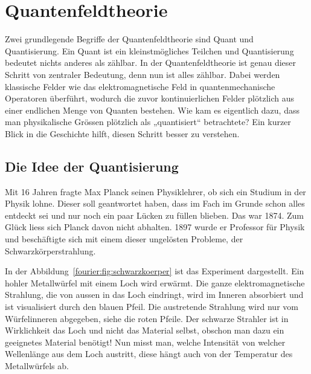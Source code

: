%
%
%
%
\section{Quantenfeldtheorie\label{fourier:section:quantenfeldtheorie}}
Zwei grundlegende Begriffe der Quantenfeldtheorie sind Quant und Quantisierung. 
Ein Quant ist ein kleinstmögliches Teilchen und Quantisierung bedeutet nichts anderes als zählbar. 
In der Quantenfeldtheorie ist genau dieser Schritt von zentraler Bedeutung, denn nun ist alles zählbar. 
Dabei werden klassische Felder wie das elektromagnetische Feld in quantenmechanische Operatoren überführt, wodurch die zuvor kontinuierlichen Felder plötzlich aus einer endlichen Menge von Quanten bestehen.
Wie kam es eigentlich dazu, dass man physikalische Grössen plötzlich als „quantisiert“ betrachtete?
Ein kurzer Blick in die Geschichte hilft, diesen Schritt besser zu verstehen.

\subsection{Die Idee der Quantisierung\label{fourier:subsection:DieIdeeDerQuantisierung}}
	Mit 16 Jahren fragte Max Planck seinen Physiklehrer, ob sich ein Studium in der Physik lohne. 
	Dieser soll geantwortet haben, dass im Fach im Grunde schon alles entdeckt sei und nur noch ein paar Lücken zu füllen blieben.
	Das war 1874.
	Zum Glück liess sich Planck davon nicht abhalten.
	1897 wurde er Professor für Physik und beschäftigte sich mit einem dieser ungelösten Probleme, der Schwarzkörperstrahlung. 
	
	
	In der Abbildung~\ref{fourier:fig:schwarzkoerper} ist das Experiment dargestellt. Ein hohler Metallwürfel mit einem Loch wird erwärmt. 
	Die ganze elektromagnetische Strahlung, die von aussen in das Loch eindringt, wird im Inneren absorbiert und ist visualisiert durch den blauen Pfeil. 
	Die austretende Strahlung wird nur vom Würfelinneren abgegeben, siehe die roten Pfeile. 
	Der schwarze Strahler ist in Wirklichkeit das Loch und nicht das Material selbst, obschon man dazu ein geeignetes Material benötigt!
	Nun misst man, welche Intensität von welcher Wellenlänge aus dem Loch austritt, diese hängt auch von der Temperatur des Metallwürfels ab. 
	

